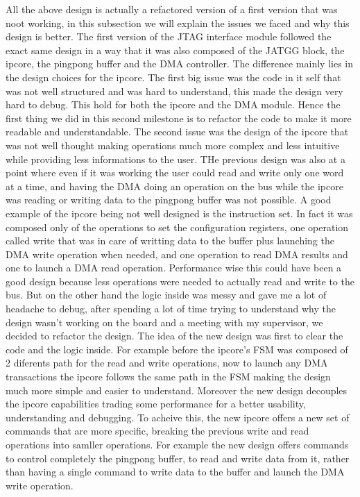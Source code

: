 \documentclass[a4paper,11pt,oneside]{report}
\begin{document}
All the above design is actually a refactored version of a first version that was noot working, in this subsection we will explain the issues we faced and why this design is better.
The first version of the JTAG interface module followed the exact same design in a way that it was also composed of the JATGG block, the ipcore, the pingpong buffer and the DMA controller.
The difference mainly lies in the design choices for the ipcore.
The first big issue was the code in it self that was not well structured and was hard to understand, this made the design  very hard to debug. This hold for both the ipcore and the DMA module.
Hence the first thing we did in this second milestone is to refactor the code to make it more readable and understandable.
The second issue was the design of the ipcore that was not well thought making operations much more complex and less intuitive while providing less informations to the user. 
THe previous design was also at a point where even if it was working the user could read and write only one word at a time, and having the DMA doing an operation on the bus while the ipcore was reading or writing data to the pingpong buffer was not possible.
A good example of the ipcore being not well designed is the instruction set. In fact it was composed only of the operations to set the configuration registers, one operation called write that was in care of writting data to the buffer plus launching the DMA write operation when needed,
and one operation to read DMA results and one to launch a DMA read operation.
Performance wise this could have been a good design because less operations were needed to actually read and write to the bus.
But on the other hand the logic inside was messy and gave me a lot of headache to debug, after spending a lot of time trying to understand why the design wasn't working on the board and a meeting with my supervisor, we decided to refactor the design.
The idea of the new design was first to clear the code and the logic inside. For example before the ipcore's FSM was composed of 2 diferents path for the read and write operations, now to launch any DMA transactions the ipcore follows the same path in the FSM making the 
design much more simple and easier to understand.
Moreover the new design decouples the ipcore capabilities trading some performance for a better usability, understanding and debugging. To acheive this, the new ipcore offers a new set of commands that are more specific, breaking the previous write and read 
operations into samller operations. For example the new design offers commands to control completely the pingpong buffer, to read and write data from it, rather than having a single command to write data to the buffer and launch the DMA write operation. 
\end{document}

